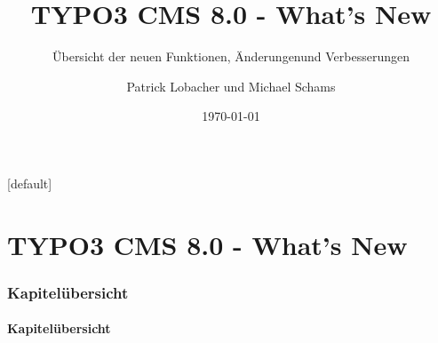 \documentclass[t]{beamer}
\title{TYPO3 CMS 8.0 - What's New}
\subtitle{Übersicht der neuen Funktionen, Änderungen\newline und Verbesserungen}
\author{
	\centerline{Patrick Lobacher und Michael Schams}
}
\date{\today}
\begin{document}
\sharefont


\begingroup
	[default]
	\begin{frame}
		\titlepage
	\end{frame}
\endgroup


\section*{TYPO3 CMS 8.0 - What's New}
\begin{frame}[fragile]
	\frametitle{Kapitelübersicht}
	\framesubtitle{Kapitelübersicht}

	\tableofcontents

\end{frame}










\end{document}

